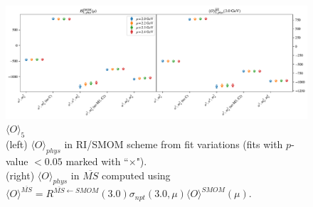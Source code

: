 \documentclass[12pt]{extarticle}
\begin{document}
\begin{figure}
\centering
\includegraphics[page=1, width=1.1\textwidth]{TT/NPR/fit_summary_fq_op.pdf}
\caption{$\langle O \rangle_{5}$\\(left) $\langle O \rangle_{phys}$ in RI/SMOM scheme from fit variations (fits with $p$-value $<0.05$ marked with ``$\times$"). \\(right) $\langle O \rangle_{phys}$ in $\overline{MS}$ computed using $\langle O \rangle^{\overline{MS}} = R^{\overline{MS}\leftarrow SMOM}(3.0)\sigma_{npt}(3.0,\mu) \langle O \rangle^{SMOM}(\mu)$.}
\end{figure}
\clearpage
\end{document}
